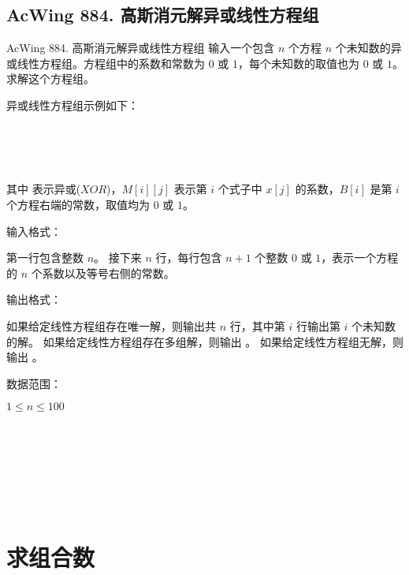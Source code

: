 \subsection{AcWing 884. 高斯消元解异或线性方程组}
\begin{titledbox}{AcWing 884. 高斯消元解异或线性方程组}
    输入一个包含 $n$ 个方程 $n$ 个未知数的异或线性方程组。方程组中的系数和常数为 $0$ 或 $1$，每个未知数的取值也为 $0$ 或 $1$。 求解这个方程组。

    异或线性方程组示例如下：

     \\
     \\
     \\


    其中 \inlinecode{^} 表示异或($XOR$)，$M[i][j]$ 表示第 $i$ 个式子中 $x[j]$ 的系数，$B[i]$ 是第 $i$ 个方程右端的常数，取值均为 $0$ 或 $1$。

    输入格式：

    第一行包含整数 $n$。 接下来 $n$ 行，每行包含 $n+1$ 个整数 $0$ 或 $1$，表示一个方程的 $n$ 个系数以及等号右侧的常数。

    输出格式：

    如果给定线性方程组存在唯一解，则输出共 $n$ 行，其中第 $i$ 行输出第 $i$ 个未知数的解。 如果给定线性方程组存在多组解，则输出 。 如果给定线性方程组无解，则输出 。

    数据范围：

    $1 \le n \le 100$

    \begin{inputblock}
         \\
         \\
         \\
    \end{inputblock}
    \begin{outputblock}
         \\
         \\
    \end{outputblock}
\end{titledbox}


\section{求组合数}

